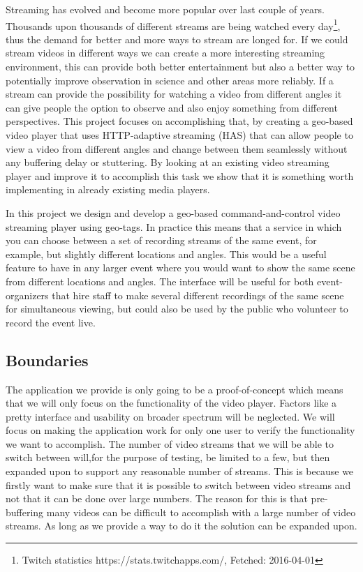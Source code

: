 \documentclass[9pt,a4paper]{acmproc}
\begin{document}
Streaming has evolved and become more popular over last couple of years. Thousands upon thousands of different streams are being watched every day\footnote{Twitch statistics https://stats.twitchapps.com/, Fetched: 2016-04-01}, thus the demand for better and more ways to stream are longed for. If we could stream videos in different ways we can create a more interesting streaming environment, this can provide both better entertainment but also a better way to potentially improve observation in science and other areas more reliably. If a stream can provide the possibility for watching a video from different angles it can give people the option to observe and also enjoy something from different perspectives. This project focuses on accomplishing that, by creating a geo-based video player that uses HTTP-adaptive streaming (HAS) that can allow people to view a video from different angles and change between them seamlessly without any buffering delay or stuttering. By looking at an existing video streaming player and improve it to accomplish this task we show that it is something worth implementing in already existing media players.

In this project we design and develop a geo-based command-and-control video streaming player using geo-tags. In practice this means that a service in which you can choose between a set of recording streams of the same event, for example, but slightly different locations and angles. This would be a useful feature to have in any larger event where you would want to show the same scene from different locations and angles. The interface will be useful for both event-organizers that hire staff to make several different recordings of the same scene for simultaneous viewing, but could also be used by the public who volunteer to record the event live.

\subsection{Boundaries}
The application we provide is only going to be a proof-of-concept which means that we will only focus on the functionality of the video player. Factors like a pretty interface and usability on broader spectrum will be neglected. We will focus on making the application work for only one user to verify the functionality we want to accomplish. The number of video streams that we will be able to switch between will,for the purpose of testing, be limited to a few, but then expanded upon to support any reasonable number of streams. This is because we firstly want to make sure that it is possible to switch between video streams and not that it can be done over large numbers. The reason for this is that pre-buffering many videos can be difficult to accomplish with a large number of video streams. As long as we provide a way to do it the solution can be expanded upon.
\end{document}
